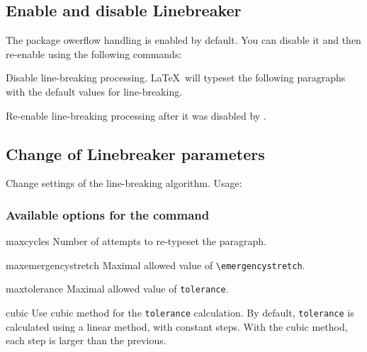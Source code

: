 \documentclass{l3doc}
\begin{document}
\subsection{Enable and disable Linebreaker}

The package owerflow handling is enabled by default. You can disable it and then re-enable using the following commands:

\begin{function}{\linebreakerdisable}
Disable line-breaking processing. \LaTeX\ will typeset the following paragraphs with the default values for line-breaking.
\end{function}

\begin{function}{\linebreakerenable}
Re-enable line-breaking processing after it was disabled by \cmd{\linebreakerdisable}.
\end{function}

\subsection{Change of Linebreaker parameters}

\begin{function}{\linebreakersetup}
  Change settings of the line-breaking algorithm.
  Usage: \cmd{\linebreakersetup}


\end{function}

\subsubsection{Available options for the \cmd{\linebreakersetup} command}

\begin{function}{maxcycles}
Number of attempts to re-typeset the paragraph.
\end{function}

\begin{function}{maxemergencystretch}
Maximal allowed value of \verb|\emergencystretch|.
\end{function}

\begin{function}{maxtolerance}
Maximal allowed value of \verb|tolerance|.
\end{function}

\begin{function}{cubic}
Use cubic method for the \verb|tolerance| calculation. By default, \verb|tolerance| is calculated
using a linear method, with constant steps. With the cubic method, each step is larger than the previous.
\end{function}
\end{document}
